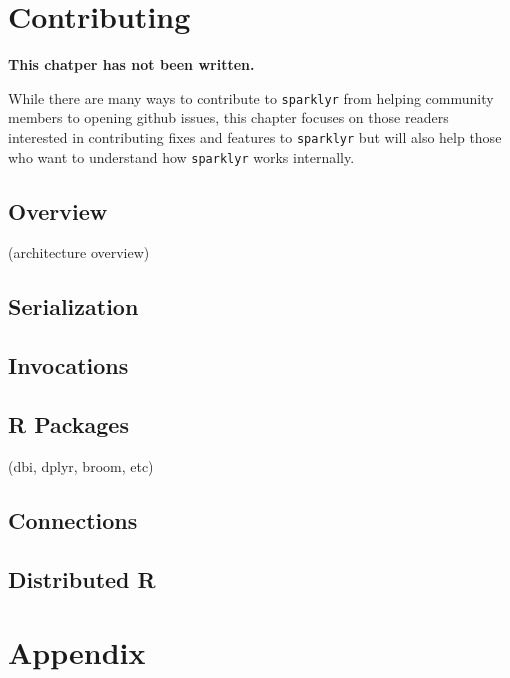 \documentclass[]{book}
\theoremstyle{definition}
\theoremstyle{definition}
\theoremstyle{definition}
\theoremstyle{remark}
\begin{document}
\hypertarget{contributing}{%
\chapter{Contributing}\label{contributing}}

\textbf{This chatper has not been written.}

While there are many ways to contribute to \texttt{sparklyr} from
helping community members to opening github issues, this chapter focuses
on those readers interested in contributing fixes and features to
\texttt{sparklyr} but will also help those who want to understand how
\texttt{sparklyr} works internally.

\hypertarget{overview-5}{%
\section{Overview}\label{overview-5}}

(architecture overview)

\hypertarget{serialization}{%
\section{Serialization}\label{serialization}}

\hypertarget{invocations}{%
\section{Invocations}\label{invocations}}

\hypertarget{r-packages}{%
\section{R Packages}\label{r-packages}}

(dbi, dplyr, broom, etc)

\hypertarget{connections-1}{%
\section{Connections}\label{connections-1}}

\hypertarget{distributed-r}{%
\section{Distributed R}\label{distributed-r}}

\hypertarget{appendix}{%
\chapter*{Appendix}\label{appendix}}
\end{document}

